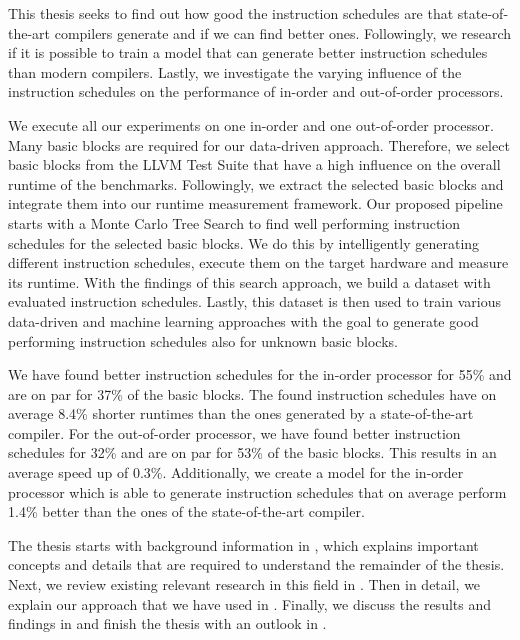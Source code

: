 This thesis seeks to find out how good the instruction schedules are that state-of-the-art compilers generate and if we can find better ones.
Followingly, we research if it is possible to train a model that can generate better instruction schedules than modern compilers.
Lastly, we investigate the varying influence of the instruction schedules on the performance of in-order and out-of-order processors.


We execute all our experiments on one in-order and one out-of-order processor.
Many basic blocks are required for our data-driven approach.
Therefore, we select basic blocks from the LLVM Test Suite that have a high influence on the overall runtime of the benchmarks.
Followingly, we extract the selected basic blocks and integrate them into our runtime measurement framework.
Our proposed pipeline starts with a Monte Carlo Tree Search to find well performing instruction schedules for the selected basic blocks.
We do this by intelligently generating different instruction schedules, execute them on the target hardware and measure its runtime.
With the findings of this search approach, we build a dataset with evaluated instruction schedules.
Lastly, this dataset is then used to train various data-driven and machine learning approaches with the goal to generate good performing instruction schedules also for unknown basic blocks.

We have found better instruction schedules for the in-order processor for 55\% and are on par for 37\% of the basic blocks.
The found instruction schedules have on average 8.4\% shorter runtimes than the ones generated by a state-of-the-art compiler.
For the out-of-order processor, we have found better instruction schedules for 32\% and are on par for 53\% of the basic blocks.
This results in an average speed up of 0.3\%.
Additionally, we create a model for the in-order processor which is able to generate instruction schedules that on average perform 1.4\% better than the ones of the state-of-the-art compiler.

The thesis starts with background information in , which explains important concepts and details that are required to understand the remainder of the thesis.
Next, we review existing relevant research in this field in .
Then in detail, we explain our approach that we have used in .
Finally, we discuss the results and findings in  and finish the thesis with an outlook in .





